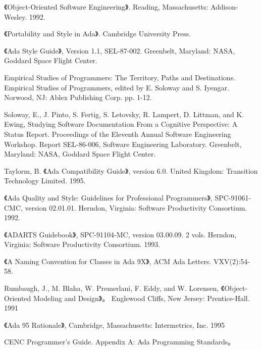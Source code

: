 \begin{thebibliography}{widest-label}
 《Object-Oriented Software
Engineering》. Reading, Massachusetts: Addison-Wesley. 1992.


 《Portability and Style in Ada》.
Cambridge University Press.

 《Ada Style Guide》, Version 1.1, SEL-87-002. Greenbelt, Maryland: NASA, Goddard Space Flight Center.

 Empirical Studies of Programmers:
The Territory, Paths and Destinations. Empirical Studies of Programmers, edited by E. Soloway and S. Iyengar. Norwood, NJ: Ablex Publishing Corp. pp. 1-12.

 Soloway, E., J. Pinto, S. Fertig, S. Letovsky, R. Lampert, D. Littman, and K. Ewing,
Studying Software Documentation From a Cognitive Perspective: A Status Report. Proceedings of the Eleventh Annual Software Engineering Workshop. Report SEL-86-006, Software Engineering Laboratory. Greenbelt, Maryland: NASA, Goddard Space Flight Center. 

 Taylorm, B.
《Ada Compatibility Guide》, version 6.0. United Kingdom:
Transition Technology Limited. 1995.


 《Ada Quality and Style: Guidelines
for Professional Programmers》, SPC-91061-CMC, version 02.01.01.
Herndon, Virginia: Software Productivity Consortium. 1992.

 《ADARTS Guidebook》, SPC-91104-MC,
version 03.00.09. 2 vols. Herndon, Virginia: Software Productivity Consortium.
1993.

 《A Naming Convention for Classes in Ada 9X》, ACM Ada Letters. VXV(2):54-58.

 Rumbaugh, J., M. Blaha, W. Premerlani, F. Eddy, and W. Lorensen, 《Object-Oriented Modeling and Design》。
Englewood Cliffs, New Jersey: Prentice-Hall. 1991

 《Ada 95 Rationale》, Cambridge,
Massachusetts: Intermetrics, Inc. 1995

 CENC Programmer's Guide. Appendix A: Ada Programming Standards。

\end{thebibliography}
